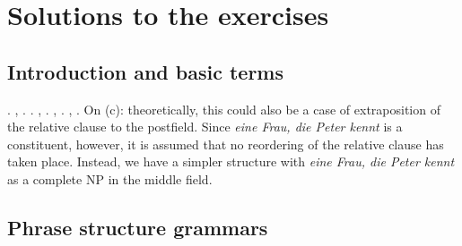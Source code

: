 \chapter{Solutions to the exercises}


\section{Introduction and basic terms}


\eal
\ex {} .
\ex {}  , .
\ex {}  .
\ex {}  , .
\ex {},  .
\ex {},  .
\zl
On (c): theoretically, this could also be a case of extraposition of the relative clause to
the postfield. Since \emph{eine Frau, die Peter kennt} is a constituent, however, it is assumed that
no reordering of the relative clause has taken place. Instead, we have a simpler structure with
\emph{eine Frau, die Peter kennt} as a complete NP in the middle field.


\section{Phrase structure grammars}




